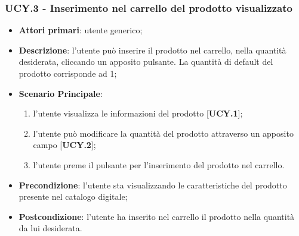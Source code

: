\subsubsection{UCY.3 - Inserimento nel carrello del prodotto visualizzato}
\begin{itemize}
\item \textbf{Attori primari}: utente generico;
\item \textbf{Descrizione}: l'utente può inserire il prodotto nel carrello, nella quantità desiderata, cliccando un apposito pulsante. La quantità di default del prodotto corrisponde ad 1;
\item \textbf{Scenario Principale}:
\begin{enumerate}
\item l'utente visualizza le informazioni del prodotto [\textbf{UCY.1}];
\item l'utente può modificare la quantità del prodotto attraverso un apposito campo [\textbf{UCY.2}];
\item l'utente preme il pulsante per l'inserimento del prodotto nel carrello.
\end{enumerate}
\item \textbf{Precondizione}: l'utente sta visualizzando le caratteristiche del prodotto presente nel catalogo digitale;
\item \textbf{Postcondizione}: l'utente ha inserito nel carrello il prodotto nella quantità da lui desiderata.
\end{itemize}